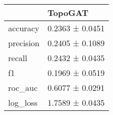 \begin{tabular}{ll}
\toprule
 & TopoGAT \\
\midrule
accuracy & 0.2363 ± 0.0451 \\
precision & 0.2405 ± 0.1089 \\
recall & 0.2432 ± 0.0435 \\
f1 & 0.1969 ± 0.0519 \\
roc_auc & 0.6077 ± 0.0291 \\
log_loss & 1.7589 ± 0.0435 \\
\bottomrule
\end{tabular}
